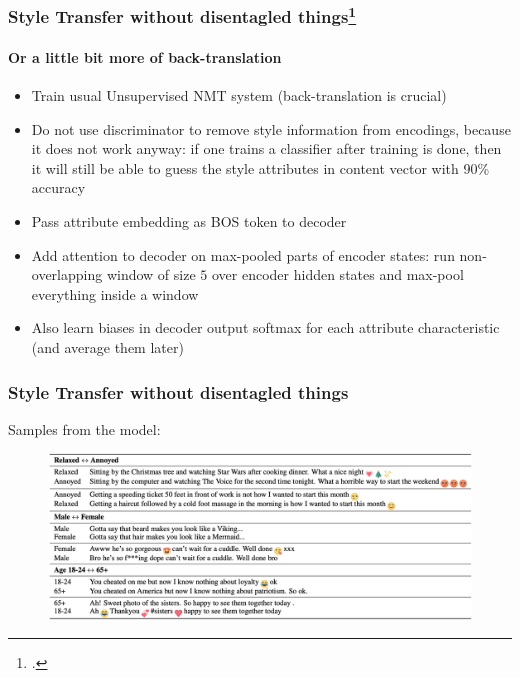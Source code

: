 \documentclass[10pt]{beamer}
\begin{document}
\begin{frame}
\frametitle{Style Transfer without disentagled things\footcite{MultipleAttributeTextStyleTransfer}}
\framesubtitle{Or a little bit more of back-translation}
\begin{itemize}
    \item Train usual Unsupervised NMT system (back-translation is crucial)
    \item Do not use discriminator to remove style information from encodings, because it does not work anyway: if one trains a classifier after training is done, then it will still be able to guess the style attributes in content vector with 90\% accuracy
    \item Pass attribute embedding as BOS token to decoder
    \item Add attention to decoder on max-pooled parts of encoder states: run non-overlapping window of size $5$ over encoder hidden states and max-pool everything inside a window
    \item Also learn biases in decoder output softmax for each attribute characteristic (and average them later)
\end{itemize}
\end{frame}


\begin{frame}
\frametitle{Style Transfer without disentagled things}
Samples from the model:
\begin{figure}
\centering
\includegraphics[width=\textwidth]{images/style-transfer-without-disentangling-samles}
\end{figure}
\end{frame}
\end{document}
